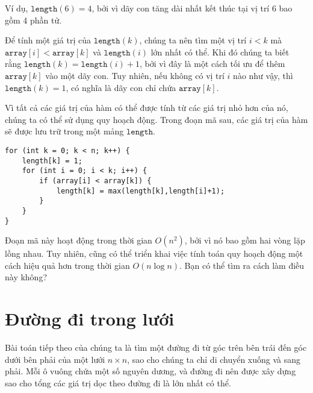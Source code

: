 Ví dụ, $\texttt{length}(6)=4$,
bởi vì dãy con tăng dài nhất
kết thúc tại vị trí 6 bao gồm 4 phần tử.

Để tính một giá trị của $\texttt{length}(k)$,
chúng ta nên tìm một vị trí $i<k$
mà $\texttt{array}[i]<\texttt{array}[k]$
và $\texttt{length}(i)$ lớn nhất có thể.
Khi đó chúng ta biết rằng
$\texttt{length}(k)=\texttt{length}(i)+1$,
bởi vì đây là một cách tối ưu để thêm
$\texttt{array}[k]$ vào một dãy con.
Tuy nhiên, nếu không có vị trí $i$ nào như vậy,
thì $\texttt{length}(k)=1$,
có nghĩa là dãy con chỉ chứa
$\texttt{array}[k]$.

Vì tất cả các giá trị của hàm có thể được tính
từ các giá trị nhỏ hơn của nó,
chúng ta có thể sử dụng quy hoạch động.
Trong đoạn mã sau, các giá trị
của hàm sẽ được lưu trữ trong một mảng
$\texttt{length}$.

\begin{lstlisting}
for (int k = 0; k < n; k++) {
    length[k] = 1;
    for (int i = 0; i < k; i++) {
        if (array[i] < array[k]) {
            length[k] = max(length[k],length[i]+1);
        }
    }
}
\end{lstlisting}

Đoạn mã này hoạt động trong thời gian $O(n^2)$,
bởi vì nó bao gồm hai vòng lặp lồng nhau.
Tuy nhiên, cũng có thể triển khai
việc tính toán quy hoạch động
một cách hiệu quả hơn trong thời gian $O(n \log n)$.
Bạn có thể tìm ra cách làm điều này không?

\section{Đường đi trong lưới}

Bài toán tiếp theo của chúng ta là tìm một đường đi
từ góc trên bên trái đến
góc dưới bên phải
của một lưới $n \times n$, sao cho
chúng ta chỉ di chuyển xuống và sang phải.
Mỗi ô vuông chứa một số nguyên dương,
và đường đi nên được xây dựng sao cho
tổng các giá trị dọc theo
đường đi là lớn nhất có thể.

